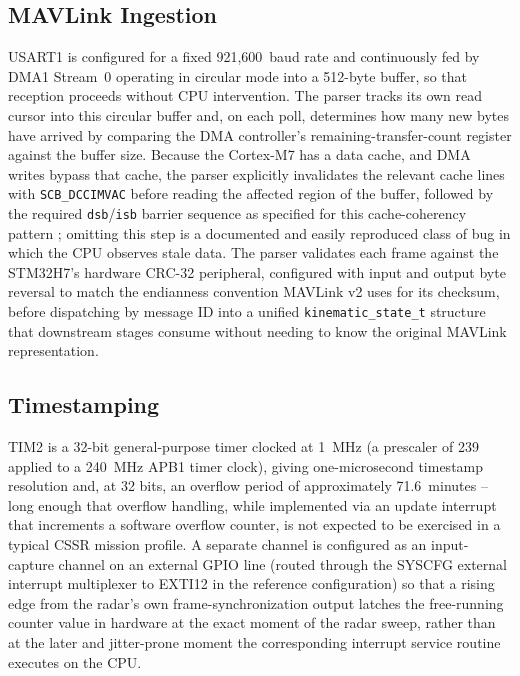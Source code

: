 \documentclass[conference]{IEEEtran}
\begin{document}
\subsection{MAVLink Ingestion}

USART1 is configured for a fixed 921{,}600~baud rate and continuously fed by DMA1 Stream~0 operating in circular mode into a 512-byte buffer, so that reception proceeds without CPU intervention. The parser tracks its own read cursor into this circular buffer and, on each poll, determines how many new bytes have arrived by comparing the DMA controller's remaining-transfer-count register against the buffer size. Because the Cortex-M7 has a data cache, and DMA writes bypass that cache, the parser explicitly invalidates the relevant cache lines with \texttt{SCB\_DCCIMVAC} before reading the affected region of the buffer, followed by the required \texttt{dsb}/\texttt{isb} barrier sequence as specified for this cache-coherency pattern \cite{r9}; omitting this step is a documented and easily reproduced class of bug in which the CPU observes stale data. The parser validates each frame against the STM32H7's hardware CRC-32 peripheral, configured with input and output byte reversal to match the endianness convention MAVLink v2 uses for its checksum, before dispatching by message ID into a unified \texttt{kinematic\_state\_t} structure that downstream stages consume without needing to know the original MAVLink representation.

\subsection{Timestamping}

TIM2 is a 32-bit general-purpose timer clocked at 1~MHz (a prescaler of 239 applied to a 240~MHz APB1 timer clock), giving one-microsecond timestamp resolution and, at 32 bits, an overflow period of approximately 71.6~minutes -- long enough that overflow handling, while implemented via an update interrupt that increments a software overflow counter, is not expected to be exercised in a typical CSSR mission profile. A separate channel is configured as an input-capture channel on an external GPIO line (routed through the SYSCFG external interrupt multiplexer to EXTI12 in the reference configuration) so that a rising edge from the radar's own frame-synchronization output latches the free-running counter value in hardware at the exact moment of the radar sweep, rather than at the later and jitter-prone moment the corresponding interrupt service routine executes on the CPU.
\end{document}
